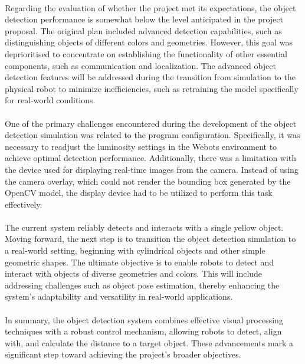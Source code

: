 \paragraph*{}
Regarding the evaluation of whether the project met its expectations, the object detection performance is somewhat below the level anticipated in the project proposal. The original plan included advanced detection capabilities, such as distinguishing objects of different colors and geometries. However, this goal was deprioritised to concentrate on establishing the functionality of other essential components, such as communication and localization. The advanced object detection features will be addressed during the transition from simulation to the physical robot to minimize inefficiencies, such as retraining the model specifically for real-world conditions.

\paragraph*{}
One of the primary challenges encountered during the development of the object detection simulation was related to the program configuration. Specifically, it was necessary to readjust the luminosity settings in the Webots environment to achieve optimal detection performance. Additionally, there was a limitation with the device used for displaying real-time images from the camera. Instead of using the camera overlay, which could not render the bounding box generated by the OpenCV model, the display device had to be utilized to perform this task effectively.

\paragraph*{}
The current system reliably detects and interacts with a single yellow object. Moving forward, the next step is to transition the object detection simulation to a real-world setting, beginning with cylindrical objects and other simple geometric shapes. The ultimate objective is to enable robots to detect and interact with objects of diverse geometries and colors. This will include addressing challenges such as object pose estimation, thereby enhancing the system's adaptability and versatility in real-world applications.

\paragraph*{}
In summary, the object detection system combines effective visual processing techniques with a robust control mechanism, allowing robots to detect, align with, and calculate the distance to a target object. These advancements mark a significant step toward achieving the project's broader objectives.
